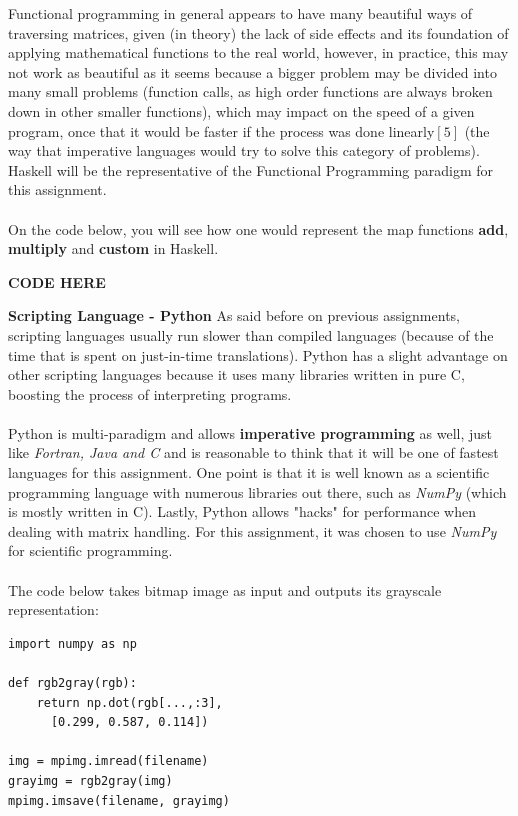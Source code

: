 \documentclass[conference]{IEEEtran}
\begin{document}
Functional programming in general appears to have many beautiful ways of traversing matrices, given (in theory) the lack of side effects and its foundation of applying mathematical functions to the real world, however, in practice, this may not work as beautiful as it seems because a bigger problem may be divided into many small problems (function calls, as high order functions are always broken down in other smaller functions), which may impact on the speed of a given program, once that it would be faster if the process was done linearly$[5]$ (the way that imperative languages would try to solve this category of problems). Haskell will be the representative of the Functional Programming paradigm for this assignment.
\\\\
On the code below, you will see how one would represent the map functions \textbf{add}, \textbf{multiply} and \textbf{custom} in Haskell.



\textbf{CODE HERE}

\textbf{ Scripting Language - Python }
As said before on previous assignments, scripting languages usually run slower than compiled languages (because of the time that is spent on just-in-time translations). Python has a slight advantage on other scripting languages because it uses many libraries written in pure C, boosting the process of interpreting programs.
\\\\
Python is multi-paradigm and allows \textbf{imperative programming} as well, just like \textit{Fortran, Java and C} and is reasonable to think that it will be one of fastest languages for this assignment. One point is that it is well known as a scientific programming language with numerous libraries out there, such as \textit{NumPy} (which is mostly written in C). Lastly, Python allows "hacks" for performance when dealing with matrix handling. For this assignment, it was chosen to use \textit{NumPy} for scientific programming.
\\\\
The code below takes bitmap image as input and outputs its grayscale representation:

\lstset{language=python}
\begin{lstlisting}[frame=single]
import numpy as np

def rgb2gray(rgb):
    return np.dot(rgb[...,:3],
      [0.299, 0.587, 0.114])

img = mpimg.imread(filename)     
grayimg = rgb2gray(img)    
mpimg.imsave(filename, grayimg)
\end{lstlisting}
\end{document}
